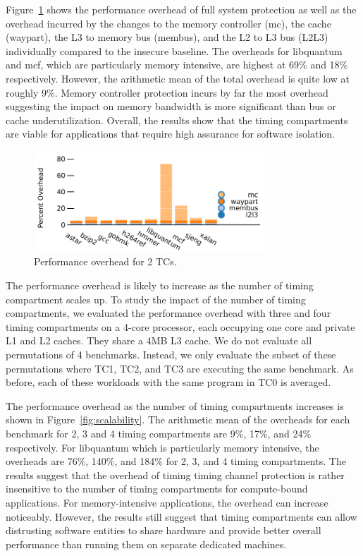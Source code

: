 Figure~\ref{fig:performance} shows the performance overhead of full system 
protection as well as the overhead incurred by the changes to the memory 
controller (mc), the cache (waypart), the L3 to memory bus (membus), and the L2 
to L3 bus (L2L3) individually compared to the insecure baseline. The
overheads for libquantum and mcf, which are particularly memory intensive, are 
highest at 69\% and 18\% respectively. However, the arithmetic mean of the 
total overhead is quite low at roughly 9\%. Memory controller protection incurs 
by far the most overhead suggesting the impact on memory bandwidth is more 
significant than bus or cache underutilization. Overall, the results show that 
the timing compartments are viable for applications that require high assurance 
for software isolation.

\begin{figure}
    \begin{center}
        \includegraphics[width=3.4in]{figs/breakdown.pdf}
        \caption{Performance overhead for 2 TCs.}
        \label{fig:performance}
    \end{center}
\end{figure}

The performance overhead is likely to increase as the number of timing 
compartment scales up. To study the impact of the number of timing 
compartments, we evaluated the performance overhead with three and four timing 
compartments on a 4-core  processor, each occupying one core and private L1 and 
L2 caches. They share a 4MB L3 cache. We do not evaluate all permutations of 4 
benchmarks. Instead, we only evaluate the subset of these permutations where 
TC1, TC2, and TC3 are executing the same benchmark. As before, each of these 
workloads with the same program in TC0 is averaged.

The performance overhead as the number of timing compartments increases is 
shown in Figure~\ref{fig:scalability}. The arithmetic mean of the overheads for 
each benchmark for 2, 3 and 4 timing compartments are 9\%, 17\%, and 24\% 
respectively. For libquantum which is particularly memory intensive, the 
overheads are 76\%, 140\%, and 184\% for 2, 3, and 4 timing compartments. The 
results suggest that the overhead of timing timing channel protection is rather 
insensitive to the number of timing compartments for compute-bound 
applications. For memory-intensive applications, the overhead can increase 
noticeably. However, the results still suggest that timing compartments can 
allow distrusting software entities to share hardware and provide better 
overall performance than running them on separate dedicated machines.


